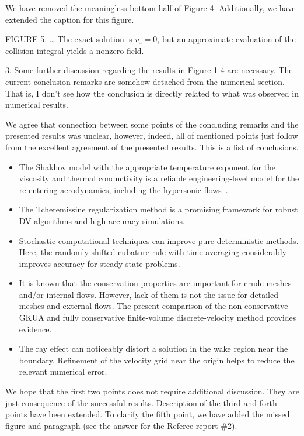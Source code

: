 \documentclass{article}
\begin{document}
We have removed the meaningless bottom half of Figure 4. Additionally, we have extended the caption for this figure.
\begin{leftbar}
    FIGURE 5. \dots
    The exact solution is \(v_z=0\), but an approximate evaluation of the collision integral yields a nonzero field.
\end{leftbar}

\begin{quoting}
    3. Some further discussion regarding the results in Figure 1-4 are necessary.
    The current conclusion remarks are somehow detached from the numerical section.
    That is, I don’t see how the conclusion is directly related to what was observed in numerical results.
\end{quoting}

We agree that connection between some points of the concluding remarks and the presented results was unclear,
however, indeed, all of mentioned points just follow from the excellent agreement of the presented results.
This is a list of conclusions.
\begin{itemize}
    \item The Shakhov model with the appropriate temperature exponent for the viscosity and thermal conductivity
    is a reliable engineering-level model for the re-entering aerodynamics,
    including the hypersonic flows~\cite{Titarev2018, Frolova2018}.
    \item The Tcheremissine regularization method is a promising framework for robust DV algorithms and high-accuracy simulations.
    \item Stochastic computational techniques can improve pure deterministic methods.
    Here, the randomly shifted cubature rule with time averaging considerably improves accuracy for steady-state problems.
    \item It is known that the conservation properties are important for crude meshes and/or internal flows.
    However, lack of them is not the issue for detailed meshes and external flows. The present comparison of
    the non-conservative GKUA and fully conservative finite-volume discrete-velocity method provides evidence.
    \item The ray effect can noticeably distort a solution in the wake region near the boundary.
    Refinement of the velocity grid near the origin helps to reduce the relevant numerical error.
\end{itemize}

We hope that the first two points does not require additional discussion.
They are just consequence of the successful results.
Description of the third and forth points have been extended.
To clarify the fifth point, we have added the missed figure and paragraph (see the answer for the Referee report \#2).
\end{document}
